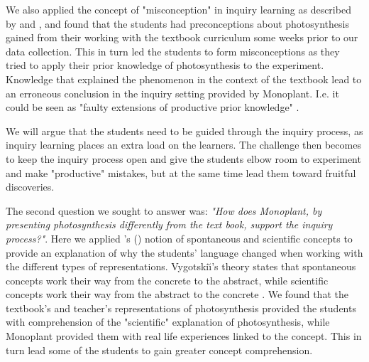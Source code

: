 We also applied the concept of "misconception" in inquiry learning as described by \citet{gomez2008elementary} and \citet{smith1994misconceptions}, and found that the students had preconceptions about photosynthesis gained from their working with the textbook curriculum some weeks prior to our data collection. This in turn led the students to form misconceptions as they tried to apply their prior knowledge of photosynthesis to the experiment. Knowledge that explained the phenomenon in the context of the textbook lead to an erroneous conclusion in the inquiry setting provided by Monoplant. I.e. it could be seen as "faulty extensions of productive prior knowledge" \citep{smith1994misconceptions}. 

We will argue that the students need to be guided through the inquiry process, as inquiry learning places an extra load on the learners. The challenge then becomes to keep the inquiry process open and give the students elbow room to experiment and make "productive" mistakes, but at the same time lead them toward fruitful discoveries. 



The second question we sought to answer was: \emph{"How does Monoplant, by presenting photosynthesis differently from the text book, support the inquiry process?"}. Here we applied \citeauthor{vygotsky2012thought}'s (\citeyear{vygotsky2012thought}) notion of spontaneous and scientific concepts to provide an explanation of why the students' language changed when working with the different types of representations. Vygotski{\u\i}'s theory states that spontaneous concepts work their way from the concrete to the abstract, while scientific concepts work their way from the abstract to the concrete \citep{vygotsky2012thought}. We found that the textbook's and teacher's representations of photosynthesis provided the students with comprehension of the "scientific" explanation of photosynthesis, while Monoplant provided them with real life experiences linked to the concept. This in turn lead some of the students to gain greater concept comprehension. 

